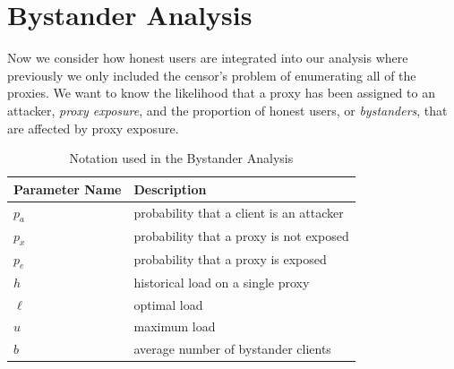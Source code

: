 \label{sec:bystander}
\section{Bystander Analysis}

Now we consider how honest users are integrated into our analysis where previously we only included the censor's problem of enumerating all of the proxies. We want to know the likelihood that a proxy has been assigned to an attacker, \textit{proxy exposure}, and the proportion of honest users, or \textit{bystanders}, that are affected by proxy exposure.

\begin{table}[h]
  \centering
	\begin{tabular}{ll}
	\hline
	\cline{1-2}
	Parameter Name    & Description  \\
	\hline
    $p_a$       & probability that a client is an attacker\\
    $p_x$     & probability that a proxy is not exposed \\
    $p_e$     & probability that a proxy is exposed \\
	$h$     & historical load on a single proxy  \\
	$\ell$     & optimal load \\
	$u$     & maximum load \\
	$b$     & average number of bystander clients\\

	\hline
	\end{tabular}
  \caption{Notation used in the Bystander Analysis}
  \label{tab:vars}
\end{table}

